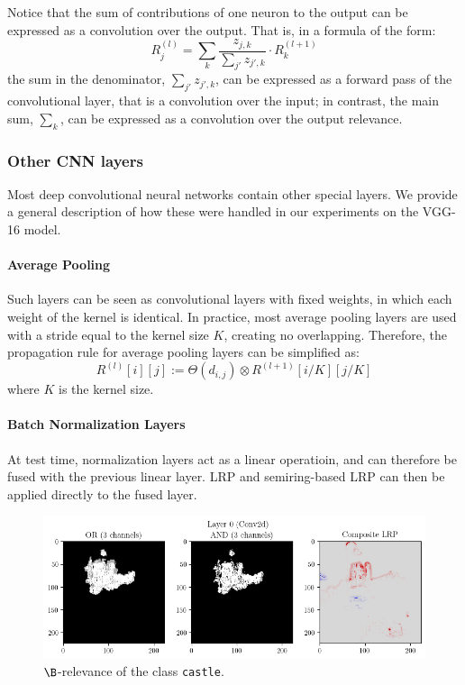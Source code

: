 \documentclass[twocolumn]{../cs-classes/cs-classes}
\newcommand*{\1}{\digitsbb{1}}
\newcommand*{\0}{\digitsbb{0}}
\begin{document}
Notice that the sum of contributions of one neuron to the output can be expressed as a convolution over the output. That is, in a formula of the form:
\begin{equation*}
    R_j^{(l)} = \sum_k \frac{z_{j,k}}{\sum_{j'}z_{j',k}} \cdot R_k^{(l+1)}
\end{equation*}
the sum in the denominator, $\sum_{j'}z_{j',k}$, can be expressed as a forward pass of the convolutional layer, that is a convolution over the input; in contrast, the main sum, $\sum_k$, can be expressed as a convolution over the output relevance.


\subsubsection{Other CNN layers}
Most deep convolutional neural networks contain other special layers. We provide a general description of how these were handled in our experiments on the VGG-16 model.

\paragraph*{Average Pooling}
Such layers can be seen as convolutional layers with fixed weights, in which each weight of the kernel is identical. In practice, most average pooling layers are used with a stride equal to the kernel size $K$, creating no overlapping. Therefore, the propagation rule for average pooling layers can be simplified as:
\begin{equation}
    R^{(l)}[i][j] := \Theta(d_{i,j}) \otimes R^{(l+1)}[i/K][j/K]
\end{equation}
where $K$ is the kernel size.

\paragraph*{Batch Normalization Layers}
At test time, normalization layers act as a linear operatioin, and can therefore be fused with the previous linear layer. LRP and semiring-based LRP can then be applied directly to the fused layer.

\begin{figure}
    \centering
    \includegraphics[width=.8\linewidth]{vgg-boolean.png}
    \caption{$\B$-relevance of the class \texttt{castle}.}
    \label{fig:vgg-boolean}
\end{figure}
\end{document}
